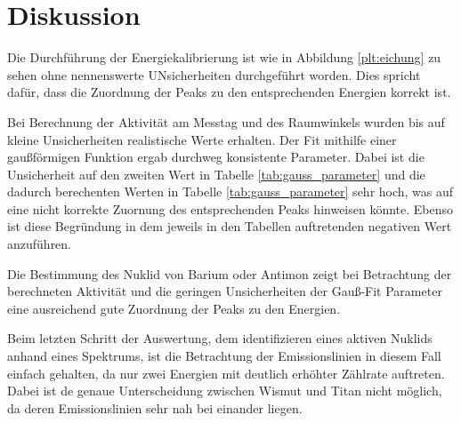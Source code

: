 \section{Diskussion}
\label{sec:Diskussion}
Die Durchführung der Energiekalibrierung ist wie in Abbildung \ref{plt:eichung}
zu sehen ohne nennenswerte UNsicherheiten durchgeführt worden. Dies spricht
dafür, dass die Zuordnung der Peaks zu den entsprechenden Energien korrekt ist.

Bei Berechnung der Aktivität am Messtag und des Raumwinkels wurden bis auf kleine
Unsicherheiten realistische Werte erhalten. Der Fit mithilfe einer gaußförmigen
Funktion ergab durchweg konsistente Parameter. Dabei ist die Unsicherheit auf
den zweiten Wert in Tabelle \ref{tab:gauss_parameter} und die dadurch
berechenten Werten in Tabelle \ref{tab:gauss_parameter} sehr hoch, was auf eine
nicht korrekte Zuornung des entsprechenden Peaks hinweisen könnte. Ebenso ist
diese Begründung in dem jeweils in den Tabellen auftretenden negativen Wert
anzuführen.

Die Bestimmung des Nuklid von Barium oder Antimon zeigt bei Betrachtung der
berechneten Aktivität und die geringen Unsicherheiten der Gauß-Fit Parameter
eine ausreichend gute Zuordnung der Peaks zu den Energien.

Beim letzten Schritt der Auswertung, dem identifizieren eines aktiven Nuklids
anhand eines Spektrums, ist die Betrachtung der Emissionslinien in diesem Fall
einfach gehalten, da nur zwei Energien mit deutlich erhöhter Zählrate auftreten.
Dabei ist de genaue Unterscheidung zwischen Wismut und Titan nicht möglich, da
deren Emissionslinien sehr nah bei einander liegen.
